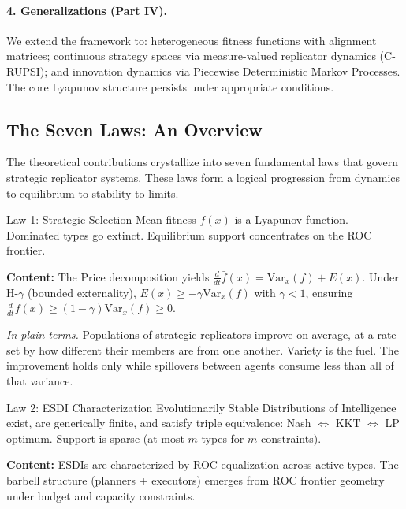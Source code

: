 \documentclass[12pt]{article}
\newcommand{\Var}{\mathrm{Var}}
\begin{document}
\paragraph{4. Generalizations (Part IV).} We extend the framework to: heterogeneous fitness functions with alignment matrices; continuous strategy spaces via measure-valued replicator dynamics (C-RUPSI); and innovation dynamics via Piecewise Deterministic Markov Processes. The core Lyapunov structure persists under appropriate conditions.


\subsection{The Seven Laws: An Overview}

The theoretical contributions crystallize into seven fundamental laws that govern strategic replicator systems. These laws form a logical progression from dynamics to equilibrium to stability to limits.

\begin{lawbox}{Law 1: Strategic Selection}
Mean fitness $\bar{f}(x)$ is a Lyapunov function. Dominated types go extinct. Equilibrium support concentrates on the ROC frontier.
\end{lawbox}

\noindent\textbf{Content:} The Price decomposition yields $\frac{d}{dt}\bar{f}(x) = \Var_x(f) + E(x)$. Under H-$\gamma$ (bounded externality), $E(x) \geq -\gamma \Var_x(f)$ with $\gamma < 1$, ensuring $\frac{d}{dt}\bar{f}(x) \geq (1-\gamma)\Var_x(f) \geq 0$.

\noindent\textit{In plain terms.} Populations of strategic replicators improve on average, at a rate set by how different their members are from one another. Variety is the fuel. The improvement holds only while spillovers between agents consume less than all of that variance.

\begin{lawbox}{Law 2: ESDI Characterization}
Evolutionarily Stable Distributions of Intelligence exist, are generically finite, and satisfy triple equivalence: Nash $\Leftrightarrow$ KKT $\Leftrightarrow$ LP optimum. Support is sparse (at most $m$ types for $m$ constraints).
\end{lawbox}

\noindent\textbf{Content:} ESDIs are characterized by ROC equalization across active types. The barbell structure (planners + executors) emerges from ROC frontier geometry under budget and capacity constraints.
\end{document}
